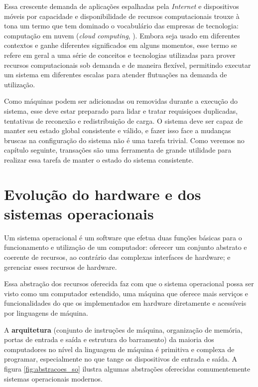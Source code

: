 \documentclass[11pt,twoside,a4paper]{book}
\begin{document}
Essa crescente demanda de aplicações espalhadas pela \emph{Internet} e dispositivos móveis por capacidade e disponibilidade de recursos computacionais trouxe à tona um termo que tem dominado o vocabulário das empresas de tecnologia: computação em nuvem (\emph{cloud computing}, \cite{cloud}). Embora seja usado em diferentes contextos e ganhe diferentes significados em alguns momentos, esse termo se refere em geral a uma série de conceitos e tecnologias utilizadas para prover recursos computacionais sob demanda e de maneira flexível, permitindo executar um sistema em diferentes escalas para atender flutuações na demanda de utilização. 

Como máquinas podem ser adicionadas ou removidas durante a execução do sistema, esse deve estar preparado para lidar e tratar requisiçoes duplicadas, tentativas de reconexão e redistribuição de carga. O sistema deve ser capaz de manter seu estado global consistente e válido, e fazer isso face a mudanças bruscas na configuração do sistema não é uma tarefa trivial. Como veremos no capítulo seguinte, transações são uma ferramenta de grande utilidade para realizar essa tarefa de manter o estado do sistema consistente. 


\section{Evolução do hardware e dos sistemas operacionais}
\label{sec:evolucao_sistemas_operacionais}
Um sistema operacional é um software que efetua duas funções básicas para o funcionamento e utilização de um computador: oferecer um conjunto abstrato e coerente de recursos, ao contrário das complexas interfaces de hardware; e gerenciar esses recursos de hardware. 

Essa abstração dos recursos oferecida faz com que o sistema operacional possa ser visto como um computador estendido, uma máquina que oferece mais serviços e funcionalidades do que os implementados em hardware diretamente e acessíveis por linguagens de máquina.

A \textbf{arquitetura} (conjunto de instruções de máquina, organização de memória, portas de entrada e saída e estrutura do barramento) da maioria dos computadores no nível da linguagem de máquina é primitiva e complexa de programar, especialmente no que tange os dispositivos de entrada e saída. A figura \ref{fig:abstracoes_so} ilustra algumas abstrações oferecidas comumentemente sistemas operacionais modernos.
\end{document}
